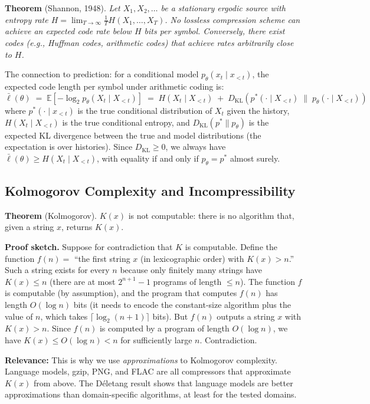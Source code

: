 \documentclass[11pt, a4paper]{article}
\begin{document}
\textbf{Theorem} (Shannon, 1948). \emph{Let $X_1, X_2, \ldots$ be a
stationary ergodic source with entropy rate
$H = \lim_{T \to \infty} \frac{1}{T} H(X_1, \ldots, X_T)$.
No lossless compression scheme can achieve an expected code rate below
$H$ bits per symbol. Conversely, there exist codes (e.g., Huffman codes,
arithmetic codes) that achieve rates arbitrarily close to $H$.}

The connection to prediction: for a conditional model
$p_\theta(x_t \mid x_{<t})$, the expected code length per symbol under
arithmetic coding is:
\[
\bar{\ell}(\theta) \;=\;
\mathbb{E}\!\left[-\log_2 p_\theta(X_t \mid X_{<t})\right]
\;=\; H(X_t \mid X_{<t}) \;+\;
D_{\text{KL}}\!\left(p^*(\cdot \mid X_{<t}) \;\|\;
p_\theta(\cdot \mid X_{<t})\right)
\]
where $p^*(\cdot \mid x_{<t})$ is the true conditional distribution of
$X_t$ given the history, $H(X_t \mid X_{<t})$ is the true conditional
entropy, and $D_{\text{KL}}(p^* \| p_\theta)$ is the expected
KL divergence between the true and model distributions (the expectation
is over histories). Since $D_{\text{KL}} \geq 0$, we always have
$\bar{\ell}(\theta) \geq H(X_t \mid X_{<t})$, with equality if and only
if $p_\theta = p^*$ almost surely.


\subsection{Kolmogorov Complexity and Incompressibility}

\textbf{Theorem} (Kolmogorov). $K(x)$ is not computable: there is no
algorithm that, given a string $x$, returns $K(x)$.

\textbf{Proof sketch.} Suppose for contradiction that $K$ is computable.
Define the function $f(n) = $ ``the first string $x$ (in lexicographic
order) with $K(x) > n$.'' Such a string exists for every $n$ because
only finitely many strings have $K(x) \leq n$ (there are at most
$2^{n+1} - 1$ programs of length $\leq n$). The function $f$ is
computable (by assumption), and the program that computes $f(n)$ has
length $O(\log n)$ bits (it needs to encode the constant-size algorithm
plus the value of $n$, which takes $\lceil \log_2(n+1) \rceil$ bits).
But $f(n)$ outputs a string $x$ with $K(x) > n$. Since $f(n)$ is
computed by a program of length $O(\log n)$, we have
$K(x) \leq O(\log n) < n$ for sufficiently large $n$. Contradiction.

\textbf{Relevance:} This is why we use \emph{approximations} to
Kolmogorov complexity. Language models, gzip, PNG, and FLAC are all
compressors that approximate $K(x)$ from above. The D\'{e}letang result
shows that language models are better approximations than domain-specific
algorithms, at least for the tested domains.
\end{document}
